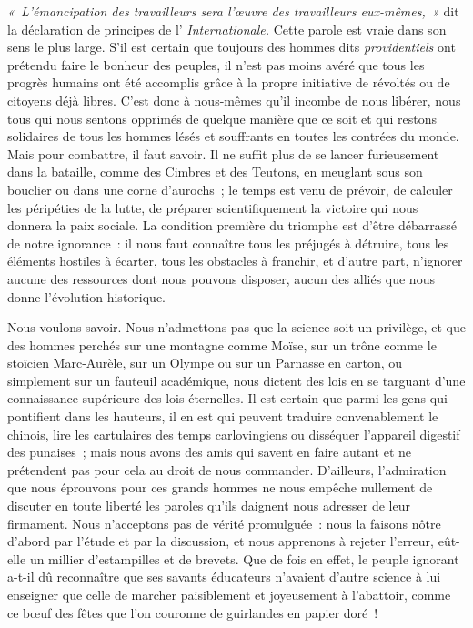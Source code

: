\documentclass[french,twoside]{book} %
\newcommand\chaptercont{} %
\begin{document}
\chaptercont
\noindent \emph{« L’émancipation des travailleurs sera l’œuvre des travailleurs eux-mêmes, »} dit la déclaration de principes de l’ \emph{Internationale.} Cette parole est vraie dans son sens le plus large. S’il est certain que toujours des hommes dits \emph{providentiels} ont prétendu faire le bonheur des peuples, il n’est pas moins avéré que tous les progrès humains ont été accomplis grâce à la  propre initiative de révoltés ou de citoyens déjà libres. C’est donc à nous-mêmes qu’il incombe de nous libérer, nous tous qui nous sentons opprimés de quelque manière que ce soit et qui restons solidaires de tous les hommes lésés et souffrants en toutes les contrées du monde. Mais pour combattre, il faut savoir. Il ne suffit plus de se lancer furieusement dans la bataille, comme des Cimbres et des Teutons, en meuglant sous son bouclier ou dans une corne d’aurochs ; le temps est venu de prévoir, de calculer les péripéties de la lutte, de préparer scientifiquement la victoire qui nous donnera la paix sociale. La condition première du triomphe est d’être débarrassé de notre ignorance : il nous faut connaître tous les préjugés à détruire,  tous les éléments hostiles à écarter, tous les obstacles à franchir, et d’autre part, n’ignorer aucune des ressources dont nous pouvons disposer, aucun des alliés que nous donne l’évolution historique.\par
Nous voulons savoir. Nous n’admettons pas que la science soit un privilège, et que des hommes perchés sur une montagne comme Moïse, sur un trône comme le stoïcien Marc-Aurèle, sur un Olympe ou sur un Parnasse en carton, ou simplement sur un fauteuil académique, nous dictent des lois en se targuant d’une connaissance supérieure des lois éternelles. Il est certain que parmi les gens qui pontifient dans les hauteurs, il en est qui peuvent traduire convenablement le chinois, lire  les cartulaires des temps carlovingiens ou disséquer l’appareil digestif des punaises ; mais nous avons des amis qui savent en faire autant et ne prétendent pas pour cela au droit de nous commander. D’ailleurs, l’admiration que nous éprouvons pour ces grands hommes ne nous empêche nullement de discuter en toute liberté les paroles qu’ils daignent nous adresser de leur firmament. Nous n’acceptons pas de vérité promulguée : nous la faisons nôtre d’abord par l’étude et par la discussion, et nous apprenons à rejeter l’erreur, eût-elle un millier d’estampilles et de brevets. Que de fois en effet, le peuple ignorant a-t-il dû reconnaître que ses savants éducateurs n’avaient d’autre science à lui enseigner que celle de marcher paisiblement et  joyeusement à l’abattoir, comme ce bœuf des fêtes que l’on couronne de guirlandes en papier doré !\par
\end{document}
